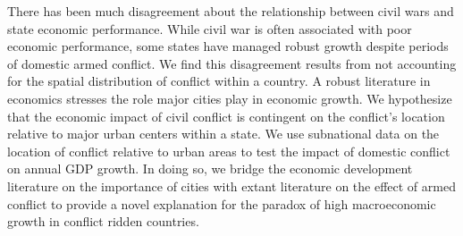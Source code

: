 


There has been much disagreement about the relationship between civil wars and state economic performance. While civil war is often associated with poor economic performance, some states have managed robust growth despite periods of domestic armed conflict. We find this disagreement results from not accounting for the spatial distribution of conflict within a country. A robust literature in economics stresses the role major cities play in economic growth. We hypothesize that the economic impact of civil conflict is contingent on the conflict's location relative to major urban centers within a state. We use subnational data on the location of conflict relative to urban areas to test the impact of domestic conflict on annual GDP growth. In doing so, we bridge the economic development literature on the importance of cities with extant literature on the effect of armed conflict to provide a novel explanation for the paradox of high macroeconomic growth in conflict ridden countries. 